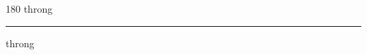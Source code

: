 
\begin{frame}
\begin{center}
\begin{turn}{180}
{\fontsize{2.5cm}{1em}\selectfont throng}
\end{turn}
\vspace{1em}\par  
\hrule
\vspace{1em}\par  
{\fontsize{2.5cm}{1em}\selectfont throng}
\end{center}
\end{frame}
